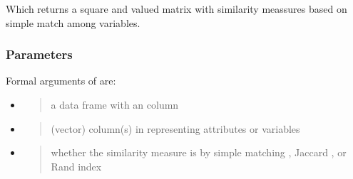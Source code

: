 \documentclass[a4paper,12pt,english]{sphinxhowto}
\begin{document}
\begin{fulllineitems}
\label{\detokenize{EpigraphicNetwork:simil}}
\end{fulllineitems}


\begin{sphinxVerbatim}[commandchars=\\\{\},formatcom=\footnotesize]
     
\end{sphinxVerbatim}

Which returns a square and valued matrix with similarity meassures based on simple match among variables.



\subsubsection{Parameters}
\label{\detokenize{EpigraphicNetwork:parameters}}
Formal arguments of  are:
\begin{itemize}
\item {} 
\begin{quote}

a data frame with an  column
\end{quote}

\item {} 
\begin{quote}

(vector) column(s) in  representing attributes or variables
\end{quote}

\item {} 
\begin{quote}

whether the similarity measure is by simple matching , Jaccard , or Rand index 
\end{quote}

\end{itemize}
\end{document}
